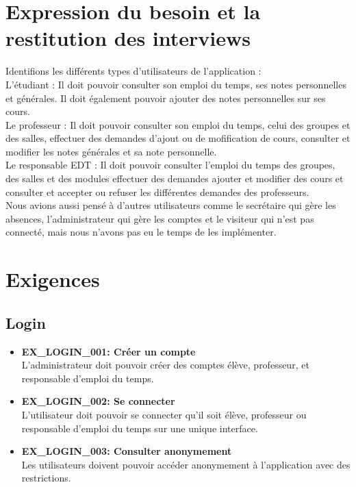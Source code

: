 \documentclass[a4paper,12pt]{article}
\begin{document}
\section{Expression du besoin et la restitution des interviews}
Identifions les différents types d'utilisateurs de l'application :\\
L'étudiant : Il doit pouvoir consulter son emploi du temps, ses notes personnelles et générales. Il doit également pouvoir ajouter des notes personnelles sur ses cours.\\
Le professeur : Il doit pouvoir consulter son emploi du temps, celui des groupes et des salles, effectuer des demandes d'ajout ou de mofification de cours, 
consulter et modifier les notes générales et sa note personnelle.\\
Le responsable EDT : Il doit pouvoir consulter l'emploi du temps des groupes, des salles et des modules effectuer des demandes 
ajouter et modifier des cours et consulter et accepter ou refuser les différentes demandes des professeurs.\\
Nous avions aussi pensé à d'autres utilisateurs comme le secrétaire qui gère les absences,
l'administrateur qui gère les comptes et le visiteur qui n'est pas connecté, mais nous n'avons pas eu le temps de les implémenter.\\

\section{Exigences}
\subsection{Login}

\begin{itemize}
    \item \textbf{EX\_LOGIN\_001: Créer un compte} \\
    L'administrateur doit pouvoir créer des comptes élève, professeur, et responsable d'emploi du temps.

    \item \textbf{EX\_LOGIN\_002: Se connecter} \\
    L'utilisateur doit pouvoir se connecter qu'il soit élève, professeur ou responsable d'emploi du temps sur une unique interface.

    \item \textbf{EX\_LOGIN\_003: Consulter anonymement} \\
    Les utilisateurs doivent pouvoir accéder anonymement à l'application avec des restrictions.
\end{itemize}
\end{document}
